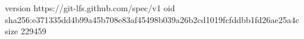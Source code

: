 version https://git-lfs.github.com/spec/v1
oid sha256:e371335dd4b99a45b708e83af45498b039a26b2cd1019fcfddbb1fd26ae25a4c
size 229459
